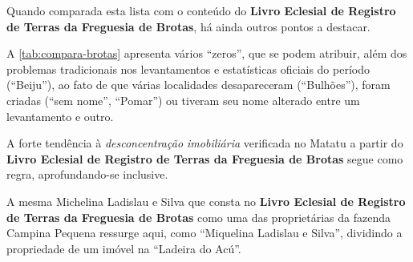 Quando comparada esta lista com o conteúdo do \textbf{Livro Eclesial de Registro de Terras da Freguesia de Brotas}, há ainda outros pontos a destacar.



A \autoref{tab:compara-brotas} apresenta vários ``zeros'', que se podem atribuir, além dos problemas tradicionais nos levantamentos e estatísticas oficiais do período (``Beiju''), ao fato de que várias localidades desapareceram (``Bulhões''), foram criadas (``sem nome'', ``Pomar'') ou tiveram seu nome alterado entre um levantamento e outro.

A forte tendência à \textit{desconcentração imobiliária} verificada no Matatu a partir do \textbf{Livro Eclesial de Registro de Terras da Freguesia de Brotas} segue como regra, aprofundando-se inclusive. 

A mesma Michelina Ladislau e Silva que consta no \textbf{Livro Eclesial de Registro de Terras da Freguesia de Brotas} como uma das proprietárias da fazenda Campina Pequena ressurge aqui, como ``Miquelina Ladislau e Silva'', dividindo a propriedade de um imóvel na ``Ladeira do Acú''.